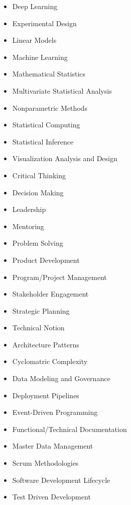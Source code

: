 
\begin{multicols*}{3}
\CompetenciesContinued
{\begin{itemize}
    \item Deep Learning
    \item Experimental Design
    \item Linear Models
    \item Machine Learning
    \item Mathematical Statistics
    \item Multivariate Statistical Analysis
    \item Nonparametric Methods
    \item Statistical Computing
    \item Statistical Inference
    \item Visualization Analysis and Design
\end{itemize}}

\CompetenciesContinued
{\begin{itemize}
    \item Critical Thinking
    \item Decision Making
    \item Leadership
    \item Mentoring
    \item Problem Solving
    \item Product Development
    \item Program/Project Management
    \item Stakeholder Engagement
    \item Strategic Planning
    \item Technical Notion
\end{itemize}}

\CompetenciesContinued
{\begin{itemize}
    \item Architecture Patterns
    \item Cyclomatric Complexity
    \item Data Modeling and Governance
    \item Deployment Pipelines
    \item Event-Driven Programming
    \item Functional/Technical Documentation
    \item Master Data Management
    \item Scrum Methodologies
    \item Software Development Lifecycle
    \item Test Driven Development
\end{itemize}}
\end{multicols*}
